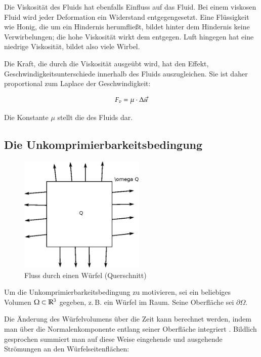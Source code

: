 Die Viskosität des Fluids hat ebenfalls Einfluss auf das Fluid. Bei einem
viskosen Fluid wird jeder Deformation ein Widerstand entgegengesetzt. Eine
Flüssigkeit wie Honig, die um ein Hindernis herumfließt, bildet hinter dem
Hindernis keine Verwirbelungen; die hohe Viskosität wirkt dem entgegen. Luft
hingegen hat eine niedrige Viskosität, bildet also viele Wirbel.


Die Kraft, die durch die Viskosität ausgeübt wird, hat den Effekt,
Geschwindigkeitsunterschiede innerhalb des Fluids auszugleichen. Sie ist
daher proportional zum Laplace der Geschwindigkeit:

\begin{equation}
\label{eq:navier_stokes_f_v}
F_v = \mu \cdot \Delta \vec{u}
\end{equation}

Die Konstante $\mu$ stellt die  des Fluids
dar.

\subsection{Die Unkomprimierbarkeitsbedingung}
\label{sec:mathematics_incompressibility_condition_section}

\begin{figure}[ht]
\includegraphics[width=6cm]{images/incompressibility_condition_example}
\caption{Fluss durch einen Würfel (Querschnitt)}
\end{figure}

Um die Unkomprimierbarkeitsbedingung zu motivieren, sei ein beliebiges Volumen
$\Omega \subset \mathbb{R}^3$ gegeben, z.\,B. ein Würfel im Raum. Seine
Oberfläche sei $\partial \Omega$.

Die Änderung des Würfelvolumens über die Zeit kann berechnet werden, indem man
über die Normalenkomponente entlang seiner Oberfläche integriert \cite{Chorin1980}. Bildlich
gesprochen summiert man auf diese Weise eingehende und ausgehende Strömungen an
den Würfelseitenflächen:

